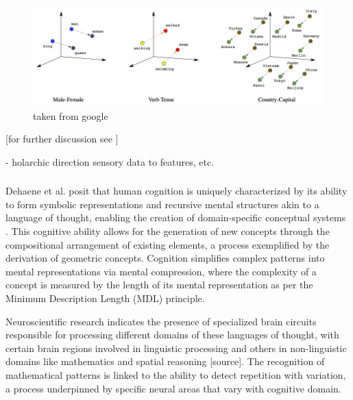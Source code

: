 \begin{figure}
    \centering
    \includegraphics[width=\textwidth]{../img/embeddings_analogies.png}
    \caption{taken from google}
    \label{fig:emb_space}
\end{figure}




[for further discussion see ]

- holarchic direction sensory data to features, etc. 






\subsubsection{}

Dehaene et al. posit that human cognition is uniquely characterized by its ability to form symbolic representations and recursive mental structures akin to a language of thought, enabling the creation of domain-specific conceptual systems \cite{dehaene_symbols_2022}. This cognitive ability allows for the generation of new concepts through the compositional arrangement of existing elements, a process exemplified by the derivation of geometric concepts. Cognition simplifies complex patterns into mental representations via mental compression, where the complexity of a concept is measured by the length of its mental representation as per the Minimum Description Length (MDL) principle.

Neuroscientific research indicates the presence of specialized brain circuits responsible for processing different domains of these languages of thought, with certain brain regions involved in linguistic processing and others in non-linguistic domains like mathematics and spatial reasoning [source]. The recognition of mathematical patterns is linked to the ability to detect repetition with variation, a process underpinned by specific neural areas that vary with cognitive domain.

